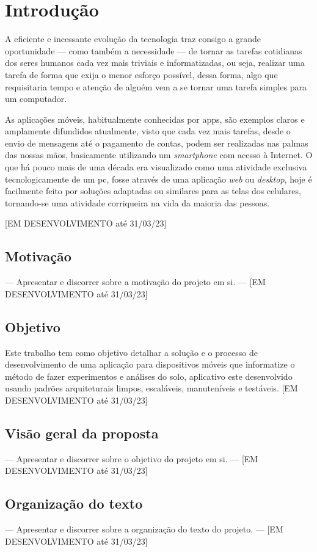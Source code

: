 \chapter{Introdução}
\label{chp:introduction}
A eficiente e incessante evolução da tecnologia traz consigo a grande oportunidade — como também a necessidade — de tornar as tarefas cotidianas dos seres humanos cada vez mais triviais e informatizadas, ou seja, realizar uma tarefa de forma que exija o menor esforço possível, dessa forma, algo que requisitaria tempo e atenção de alguém vem a se tornar uma tarefa simples para um computador.

As aplicações móveis, habitualmente conhecidas por \acp{app}, são exemplos claros e amplamente difundidos atualmente, visto que cada vez mais tarefas, desde o envio de mensagens até o pagamento de contas, podem ser realizadas nas palmas das nossas mãos, basicamente utilizando um \textit{smartphone} com acesso à Internet. O que há pouco mais de uma década era visualizado como uma atividade exclusiva tecnologicamente de um \ac{pc}, fosse através de uma aplicação \textit{web} ou \textit{desktop}, hoje é facilmente feito por soluções adaptadas ou similares para as telas dos celulares, tornando-se uma atividade corriqueira na vida da maioria das pessoas.

[EM DESENVOLVIMENTO até 31/03/23]


\section[Motivação]{Motivação}
 — Apresentar e discorrer sobre a motivação do projeto em si. — 
[EM DESENVOLVIMENTO até 31/03/23]
 
\section{Objetivo}\label{sec:objetivo}
Este trabalho tem como objetivo detalhar a solução e o processo de desenvolvimento de uma aplicação para dispositivos móveis que informatize o método de fazer experimentos e análises do solo, aplicativo este desenvolvido usando padrões arquiteturais limpos, escaláveis, manuteníveis e testáveis.
[EM DESENVOLVIMENTO até 31/03/23]

\section{Visão geral da proposta}
 — Apresentar e discorrer sobre o objetivo do projeto em si. — 
[EM DESENVOLVIMENTO até 31/03/23]

\section{Organização do texto}
 — Apresentar e discorrer sobre a 
 organização do texto do projeto. — 
[EM DESENVOLVIMENTO até 31/03/23]